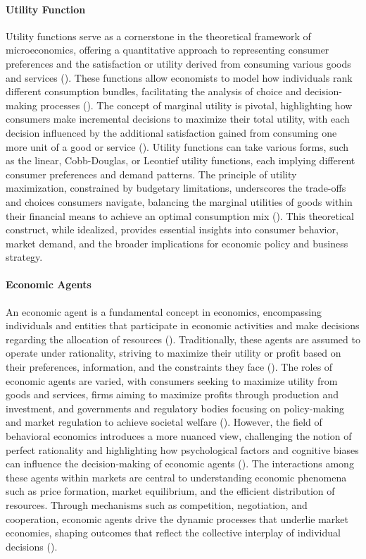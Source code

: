 \documentclass{article}
\begin{document}
\paragraph{Utility Function}
Utility functions serve as a cornerstone in the theoretical framework of microeconomics, offering a quantitative approach to representing consumer preferences and the satisfaction or utility derived from consuming various goods and services (\cite{microTextbook}). These functions allow economists to model how individuals rank different consumption bundles, facilitating the analysis of choice and decision-making processes (\cite{varian}). The concept of marginal utility is pivotal, highlighting how consumers make incremental decisions to maximize their total utility, with each decision influenced by the additional satisfaction gained from consuming one more unit of a good or service (\cite{consumerTheory}). Utility functions can take various forms, such as the linear, Cobb-Douglas, or Leontief utility functions, each implying different consumer preferences and demand patterns. The principle of utility maximization, constrained by budgetary limitations, underscores the trade-offs and choices consumers navigate, balancing the marginal utilities of goods within their financial means to achieve an optimal consumption mix (\cite{behavioralEconomics}). This theoretical construct, while idealized, provides essential insights into consumer behavior, market demand, and the broader implications for economic policy and business strategy.

\paragraph{Economic Agents}
An economic agent is a fundamental concept in economics, encompassing individuals and entities that participate in economic activities and make decisions regarding the allocation of resources (\cite{textbook}). Traditionally, these agents are assumed to operate under rationality, striving to maximize their utility or profit based on their preferences, information, and the constraints they face (\cite{advancedEconomics}). The roles of economic agents are varied, with consumers seeking to maximize utility from goods and services, firms aiming to maximize profits through production and investment, and governments and regulatory bodies focusing on policy-making and market regulation to achieve societal welfare (\cite{institutionalEconomics}). However, the field of behavioral economics introduces a more nuanced view, challenging the notion of perfect rationality and highlighting how psychological factors and cognitive biases can influence the decision-making of economic agents (\cite{kahneman}). The interactions among these agents within markets are central to understanding economic phenomena such as price formation, market equilibrium, and the efficient distribution of resources. Through mechanisms such as competition, negotiation, and cooperation, economic agents drive the dynamic processes that underlie market economies, shaping outcomes that reflect the collective interplay of individual decisions (\cite{gameTheory}).
\end{document}
